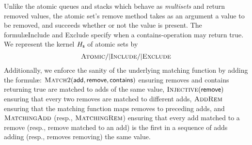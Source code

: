 \begin{example}

  Unlike the atomic queues and stacks which behave as \emph{multisets} and
  return removed values, the atomic set's {\sf remove} method takes as an
  argument a value to be removed, and succeeds whether or not the value is
  present. The formul\ae {\sc Include} and {\sc Exclude} specify when a {\sf
  contains}-operation may return {\sf true}. We represent the kernel $H_{\sf s}$
  of atomic sets by  
  \begin{align*}
    \textsc{Atomic} /| \textsc{Include} /| \textsc{Exclude}
  \end{align*}
  Additionally, we enforce the sanity of the underlying matching function by
  adding the formul\ae: $\textsc{Match2}({\sf add},{\sf
  remove},{\sf contains})$ ensuring removes and contains returning true
  are matched to adds of the same value, $\textsc{Injective}({\sf remove})$ 
  ensuring that every two removes are matched to different adds,
  $\textsc{AddRem}$ ensuring that the matching function maps removes to preceding
  adds, and 
  $\textsc{MatchingAdd}$ (resp., $\textsc{MatchingRem}$) ensuring that every add matched to a remove
  (resp., remove matched to an add) is the first in a sequence of adds adding 
  (resp., removes removing) the same value.

\end{example}

